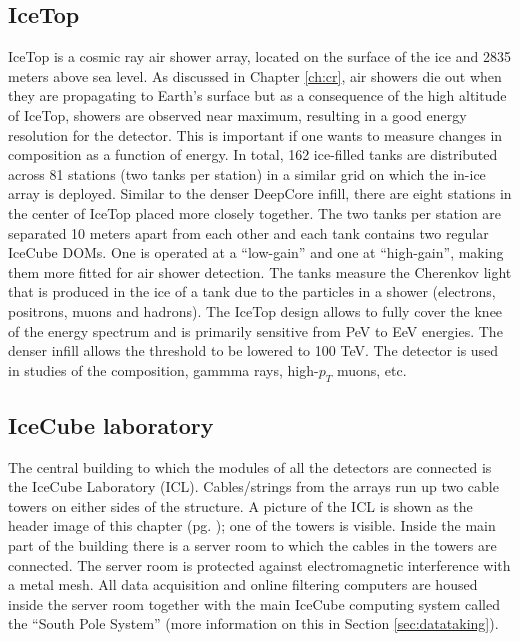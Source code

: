 \subsection{IceTop}
IceTop is a cosmic ray air shower array, located on the surface of the ice and 2835 meters above sea level. As discussed in Chapter \ref{ch:cr}, air showers die out when they are propagating to Earth's surface but as a consequence of the high altitude of IceTop, showers are observed near maximum, resulting in a good energy resolution for the detector. This is important if one wants to measure changes in composition as a function of energy. In total, 162 ice-filled tanks are distributed across 81 stations (two tanks per station) in a similar grid on which the in-ice array is deployed. Similar to the denser DeepCore infill, there are eight stations in the center of IceTop placed more closely together. The two tanks per station are separated 10 meters apart from each other and each tank contains two regular IceCube DOMs. One is operated at a ``low-gain'' and one at ``high-gain'', making them more fitted for air shower detection. The tanks measure the Cherenkov light that is produced in the ice of a tank due to the particles in a shower (electrons, positrons, muons and hadrons). The IceTop design allows to fully cover the knee of the energy spectrum and is primarily sensitive from PeV to EeV energies. The denser infill allows the threshold to be lowered to 100 TeV. The detector is used in studies of the composition, gammma rays, high-$p_T$ muons, etc. 

\subsection{IceCube laboratory}
The central building to which the modules of all the detectors are connected is the IceCube Laboratory (ICL). Cables/strings from the arrays run up two cable towers on either sides of the structure. A picture of the ICL is shown as the header image of this chapter (pg. \pageref{ch:icecube}); one of the towers is visible. Inside the main part of the building there is a server room to which the cables in the towers are connected. The server room is protected against electromagnetic interference with a metal mesh. All data acquisition and online filtering computers are housed inside the server room together with the main IceCube computing system called the ``South Pole System'' (more information on this in Section \ref{sec:datataking}). 
